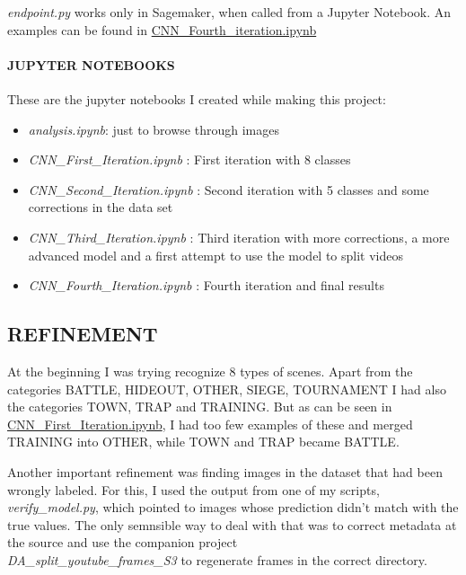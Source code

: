 \documentclass[
]{article}
\providecommand{\tightlist}{%
  \setlength{\itemsep}{0pt}\setlength{\parskip}{0pt}}
\begin{document}
\emph{endpoint.py} works only in Sagemaker, when called from a Jupyter
Notebook. An examples can be found in
\url{CNN_Fourth_iteration.ipynb}

\hypertarget{jupyter-notebooks}{%
\paragraph{JUPYTER NOTEBOOKS}\label{jupyter-notebooks}}

These are the jupyter notebooks I created while making this project:

\begin{itemize}
\tightlist
\item
  \emph{analysis.ipynb}: just to browse through images
\item
  \emph{CNN\_First\_Iteration.ipynb} : First iteration with 8 classes
\item
  \emph{CNN\_Second\_Iteration.ipynb} : Second iteration with 5 classes
  and some corrections in the data set
\item
  \emph{CNN\_Third\_Iteration.ipynb} : Third iteration with more
  corrections, a more advanced model and a first attempt to use the
  model to split videos
\item
  \emph{CNN\_Fourth\_Iteration.ipynb} : Fourth iteration and final
  results
\end{itemize}

\hypertarget{refinement}{%
\subsection{REFINEMENT}\label{refinement}}

At the beginning I was trying recognize 8 types of scenes. Apart from
the categories BATTLE, HIDEOUT, OTHER, SIEGE, TOURNAMENT I had also the
categories TOWN, TRAP and TRAINING. But as can be seen in
\url{CNN_First_Iteration.ipynb}, I had too few examples of these and
merged TRAINING into OTHER, while TOWN and TRAP became BATTLE.

Another important refinement was finding images in the dataset that had
been wrongly labeled. For this, I used the output from one of my
scripts, \emph{verify\_model.py}, which pointed to images whose
prediction didn't match with the true values. The only semnsible way to deal with
that was to correct metadata at the source and use the companion
project\\
\emph{DA\_split\_youtube\_frames\_S3} to regenerate frames in the
correct directory.
\end{document}
